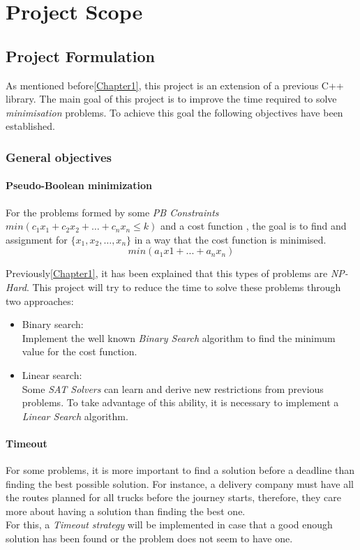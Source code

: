 \chapter{Project Scope}
\label{Chapter2}

\section{Project Formulation}

As mentioned before\ref{Chapter1}, this project is an extension of a previous C++ library. The main goal of this project is to improve the time required to solve \emph{minimisation} problems. To achieve this goal the following objectives have been established. 

\subsection{General objectives}

\subsubsection{Pseudo-Boolean minimization}
For the problems formed by some \emph{PB Constraints} $min(c_{1}x_{1}+c_{2}x_{2}+\ldots +c_{n}x_{n} \leq k)$ and a cost function , the goal is to find and assignment for $\{x_{1},x_{2},\ldots,x_{n}\}$ in a way that the cost function is minimised. $$min(a_{1}x{1} + ... + a_{n}x_{n})$$

Previously\ref{Chapter1}, it has been explained that this types of problems are \emph{NP-Hard}. This project will try to reduce the time to solve these problems through two approaches:
\begin{itemize}
	\item Binary search:\\
	Implement the well known \emph{Binary Search} algorithm to find the minimum value for the cost function.	
	\item Linear search:\\
	Some \emph{SAT Solvers} can learn and derive new restrictions from previous problems. To take advantage of this ability, it is necessary to implement a \emph{Linear Search} algorithm.
\end{itemize}

\subsubsection{Timeout}
For some problems, it is more important to find a solution before a deadline than finding the best possible solution. For instance, a delivery company must have all the routes planned for all trucks before the journey starts, therefore, they care more about having a solution than finding the best one.\\
For this, a \emph{Timeout strategy} will be implemented in case that a good enough solution has been found or the problem does not seem to have one. 
